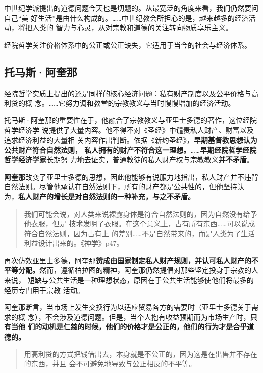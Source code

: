 中世纪学派提出的道德问题今天也是切题的。从最宽泛的角度来看，我们仍然要问自己“美
好生活”是由什么构成的。……中世纪教会所担心的是，越来越多的经济活动，将把人类的
智力与心灵，从对宗教和道德的关注转向物质享乐主义。

经院哲学关注价格体系中的公正或公正缺失，它适用于当今的社会与经济体系。

\subsection{托马斯·阿奎那}

经院哲学实质上提出的还是同样的核心经济问题：私有财产制度以及公平价格与高利贷的概
念。……它努力调和教堂的宗教教义与当时慢慢增加的经济活动。

托马斯·阿奎那的重要性在于，他融合了宗教教义与亚里士多德的著作，这位经院哲学经济学
说提供了大量内容。他不得不对《圣经》中谴责私人财产、财富以及追求经济利益的大量相
关内容作出判断。依据《新约圣经》，\textbf{早期基督教思想认为公共财产符合自然法则，
  私人拥有的财产不符合这一理想。}……\textbf{早期经院哲学经院哲学经济学家}长期努
力地去证实，普通教徒的私人财产权与宗教教义\textbf{并不矛盾}。

\textbf{阿奎那}改变了亚里士多德的思想，因此他能够有说服力地指出，私人财产并不违背
自然法则。尽管他承认在自然法则下，所有的财产都是公共性的，但他坚持认
为，\textbf{私人财产的增长是对自然法则的一种补充，与之不矛盾。}

\begin{quotation}
  我们可能会说，对人类来说裸露身体是符合自然法则的，因为自然没有给予他衣服，但是
  技术发明了衣服。在这个意义上，占有所有东西……可以说成符合自然法则，因为占有上
  的差别……不是自然带来的，而是人类为了生活利益设计出来的。《神学》p47。
\end{quotation}

再次仿效亚里士多德，阿奎那\textbf{赞成由国家制定私人财产规则，并认可私人财产的不
  平等分配。}然而，遵循柏拉图的精神，阿奎那仍然提倡对那些坚定投身于宗教的人来说，
短缺与公共生活是一种理想状态，原因在于公共生活能够使他们将最多的经历专门用于宗教
活动。

阿奎那断言，当市场上发生交换行为以适应贸易各方的需要时（亚里士多德关于需求的概
念），不会涉及道德问题。但是，当个人抱有收益预期而为市场生产时，\textbf{只有当他
  们的动机是仁慈的时候，他们的价格才是公正的，他们的行为才是合乎道德的。}

\begin{quotation}
  用高利贷的方式把钱借出去，本身就是不公正的，因为这是在出售并不存在的东西，并且
  会不可避免地导致与公正相反的不平等。
\end{quotation}

